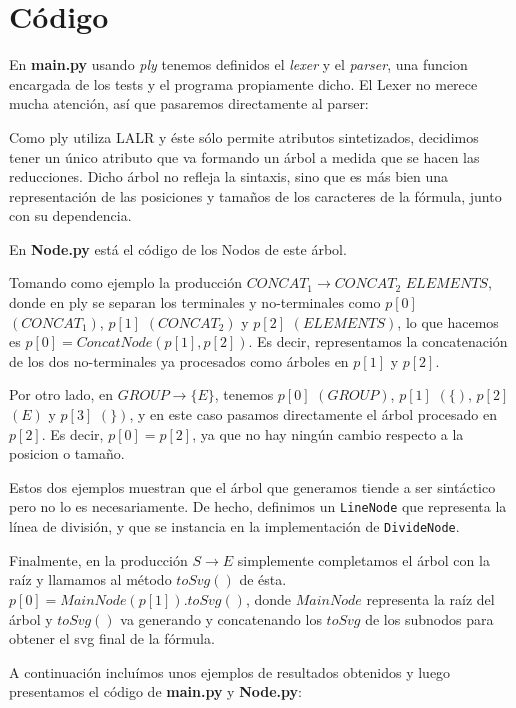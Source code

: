 \section{C\'odigo}

\par En \textbf{main.py} usando \textit{ply} tenemos definidos el \textit{lexer} y el \textit{parser}, una funcion encargada de los tests y el programa propiamente dicho. El Lexer no merece mucha atenci\'on, as\'i que pasaremos directamente al parser:
\par Como ply utiliza LALR y \'este s\'olo permite atributos sintetizados, decidimos tener un \'unico atributo que va formando un \'arbol a medida que se hacen las reducciones. Dicho \'arbol no refleja la sintaxis, sino que es m\'as bien una representaci\'on de las posiciones y tama\~nos de los caracteres de la f\'ormula, junto con su dependencia.
\par En \textbf{Node.py} est\'a el c\'odigo de los Nodos de este \'arbol.
\par Tomando como ejemplo la producci\'on $CONCAT_1 \rightarrow CONCAT_2$ $ELEMENTS$, donde en ply se separan los terminales y no-terminales como $p[0]$ $(CONCAT_1)$, $p[1]$ $(CONCAT_2)$ y $p[2]$ $(ELEMENTS)$, lo que hacemos es $p[0] = ConcatNode(p[1], p[2])$. Es decir, representamos la concatenaci\'on de los dos no-terminales ya procesados como \'arboles en $p[1]$ y $p[2]$.
\par Por otro lado, en $GROUP \rightarrow \{ E \}$, tenemos $p[0]$ $(GROUP)$, $p[1]$ $(\{)$, $p[2]$ $(E)$ y $p[3]$ $(\})$, y en este caso pasamos directamente el \'arbol procesado en $p[2]$. Es decir, $p[0] = p[2]$, ya que no hay ning\'un cambio respecto a la posicion o tama\~no.
\par Estos dos ejemplos muestran que el \'arbol que generamos tiende a ser sint\'actico pero no lo es necesariamente. De hecho, definimos un \texttt{LineNode} que representa la l\'inea de divisi\'on, y que se instancia en la implementaci\'on de \texttt{DivideNode}.
\par Finalmente, en la producci\'on $S \rightarrow E$ simplemente completamos el \'arbol con la ra\'iz y llamamos al m\'etodo $toSvg()$ de \'esta. $p[0] = MainNode(p[1]).toSvg()$, donde $MainNode$ representa la ra\'iz del \'arbol y $toSvg()$ va generando y concatenando los $toSvg$ de los subnodos para obtener el svg final de la f\'ormula.

\par \phantom{a}
\par A continuaci\'on inclu\'imos unos ejemplos de resultados obtenidos y luego presentamos el c\'odigo de \textbf{main.py} y \textbf{Node.py}:


